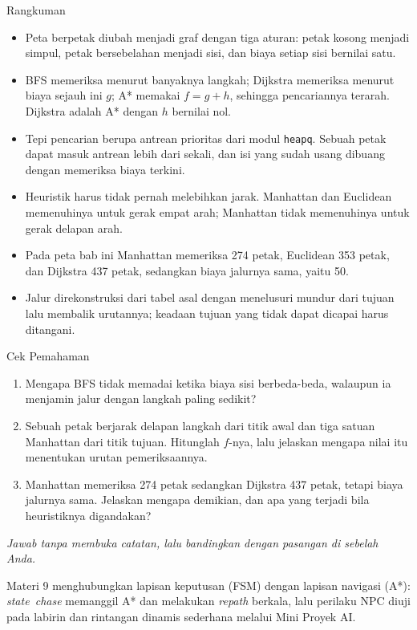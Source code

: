 \documentclass[aspectratio=169,10pt]{beamer}
\begin{document}
\begin{frame}{Rangkuman}
\begin{itemize}
  \item Peta berpetak diubah menjadi graf dengan tiga aturan: petak kosong
        menjadi simpul, petak bersebelahan menjadi sisi, dan biaya setiap sisi
        bernilai satu.
  \item BFS memeriksa menurut banyaknya langkah; Dijkstra memeriksa menurut
        biaya sejauh ini $g$; A* memakai $f = g + h$, sehingga pencariannya
        terarah. Dijkstra adalah A* dengan $h$ bernilai nol.
  \item Tepi pencarian berupa antrean prioritas dari modul \texttt{heapq}.
        Sebuah petak dapat masuk antrean lebih dari sekali, dan isi yang sudah
        usang dibuang dengan memeriksa biaya terkini.
  \item Heuristik harus tidak pernah melebihkan jarak. Manhattan dan Euclidean
        memenuhinya untuk gerak empat arah; Manhattan tidak memenuhinya untuk
        gerak delapan arah.
  \item Pada peta bab ini Manhattan memeriksa 274 petak, Euclidean 353 petak,
        dan Dijkstra 437 petak, sedangkan biaya jalurnya sama, yaitu 50.
  \item Jalur direkonstruksi dari tabel asal dengan menelusuri mundur dari
        tujuan lalu membalik urutannya; keadaan tujuan yang tidak dapat dicapai
        harus ditangani.
\end{itemize}
\end{frame}

\begin{frame}{Cek Pemahaman}
\begin{enumerate}
  \item Mengapa BFS tidak memadai ketika biaya sisi berbeda-beda, walaupun ia
        menjamin jalur dengan langkah paling sedikit?
  \item Sebuah petak berjarak delapan langkah dari titik awal dan tiga satuan
        Manhattan dari titik tujuan. Hitunglah $f$-nya, lalu jelaskan mengapa
        nilai itu menentukan urutan pemeriksaannya.
  \item Manhattan memeriksa 274 petak sedangkan Dijkstra 437 petak, tetapi
        biaya jalurnya sama. Jelaskan mengapa demikian, dan apa yang terjadi
        bila heuristiknya digandakan?
\end{enumerate}
\vspace{0.35cm}
{\footnotesize\color{ubMuted}\itshape Jawab tanpa membuka catatan, lalu
bandingkan dengan pasangan di sebelah Anda.}
\end{frame}

  {  \sloppy
   Materi 9 menghubungkan lapisan keputusan (FSM) dengan lapisan navigasi
   (A*): \mbox{\emph{state chase}} memanggil A* dan melakukan
   \mbox{\emph{repath}} berkala,
   lalu perilaku NPC diuji pada labirin dan rintangan dinamis sederhana
   melalui Mini Proyek AI.}
\end{document}
